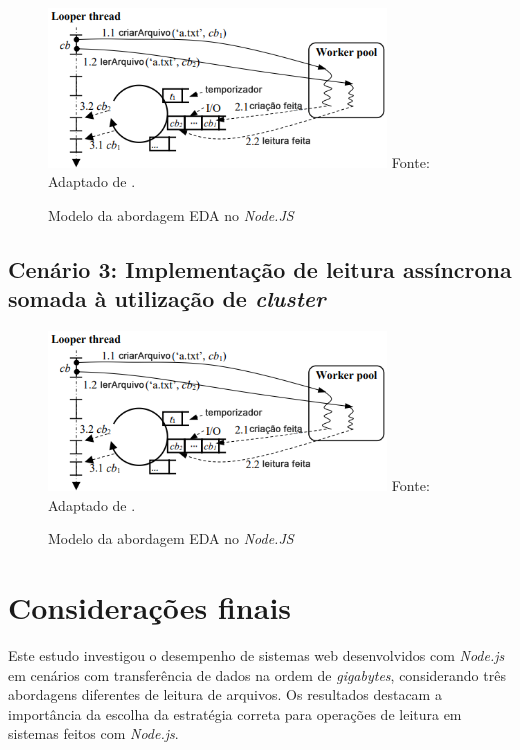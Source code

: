 \documentclass[12pt]{article}
\begin{document}
\begin{figure}[h]
\centering
\caption{Modelo da abordagem EDA no \textit{Node.JS}}
\includegraphics[width=0.8\textwidth]{images/pt-br/eda-arch-nodejs.png}
\label{fig:nodejs_eda_model}
Fonte: Adaptado de \cite{BUGS}.
\end{figure}


\subsection{Cenário 3: Implementação de leitura assíncrona somada à utilização de \textit{cluster}}

\begin{figure}[h]
\centering
\caption{Modelo da abordagem EDA no \textit{Node.JS}}
\includegraphics[width=0.8\textwidth]{images/pt-br/eda-arch-nodejs.png}
\label{fig:nodejs_eda_model}
Fonte: Adaptado de \cite{BUGS}.
\end{figure}


\section{Considerações finais}

Este estudo investigou o desempenho de sistemas web desenvolvidos com \textit{Node.js} em cenários com transferência de dados
na ordem de \textit{gigabytes}, considerando três abordagens diferentes de leitura de arquivos. Os resultados destacam
a importância da escolha da estratégia correta para operações de leitura em sistemas feitos com \textit{Node.js}.
\end{document}
